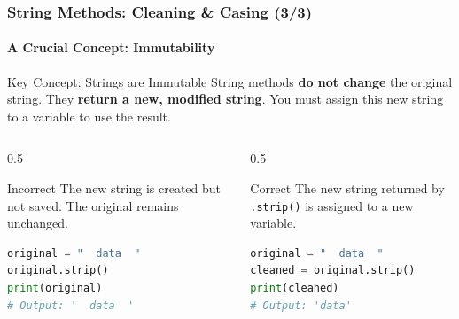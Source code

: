 \documentclass{beamer}
\begin{document}
\begin{frame}[fragile]
    \frametitle{String Methods: Cleaning \& Casing (3/3)}
    \framesubtitle{A Crucial Concept: Immutability}
    
    \begin{alertblock}{Key Concept: Strings are Immutable}
        String methods \textbf{do not change} the original string. They \textbf{return a new, modified string}. You must assign this new string to a variable to use the result.
    \end{alertblock}
    
    \begin{columns}[T]
        \begin{column}{0.5\textwidth}
            \begin{block}{Incorrect \faTimesCircle}
                The new string is created but not saved. The original remains unchanged.
\begin{lstlisting}[language=Python]
original = "  data  "
original.strip() 
print(original)
# Output: '  data  '
\end{lstlisting}
            \end{block}
        \end{column}
        \begin{column}{0.5\textwidth}
            \begin{block}{Correct \faCheckCircle}
                The new string returned by \texttt{.strip()} is assigned to a new variable.
\begin{lstlisting}[language=Python]
original = "  data  "
cleaned = original.strip()
print(cleaned)   
# Output: 'data'
\end{lstlisting}
            \end{block}
        \end{column}
    \end{columns}
    
\end{frame}
\end{document}
